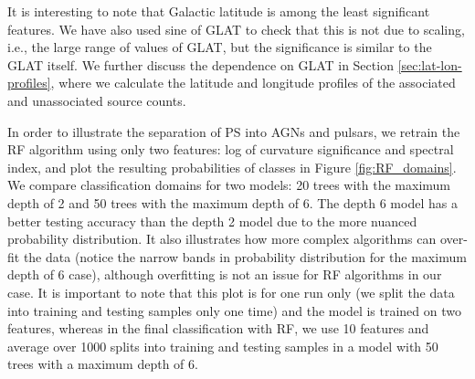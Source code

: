 It is interesting to note that Galactic latitude is among the least significant features.
We have also used sine of GLAT to check that this is not due to scaling, i.e., the large range of values of GLAT,
but the significance is similar to the GLAT itself.
We further discuss the dependence on GLAT in Section \ref{sec:lat-lon-profiles}, 
where we calculate the latitude and longitude profiles of the associated and unassociated source counts.

In order to illustrate the separation of PS into AGNs and pulsars, we retrain the RF algorithm using only two features: log of curvature significance and spectral index, and plot the resulting probabilities of classes in Figure \ref{fig:RF_domains}. 
We compare classification domains for two models: 20 trees with the maximum depth of 2 and 50 trees with the maximum depth of 6.
The depth 6 model has a better testing accuracy than the 
depth 2 model due to the more nuanced probability distribution. 
It also illustrates how more complex algorithms can over-fit the data 
(notice the narrow bands in probability distribution for the maximum depth of 6 case), 
although overfitting is not an issue for RF algorithms in our case.
It is important to note that this plot is for one run only (we split the data into training and testing samples only one time) and the model is trained on two features, whereas in the final classification with RF, we use 10 features and average over 1000 splits into training and testing samples in a model with 50 trees with a maximum depth of 6.

